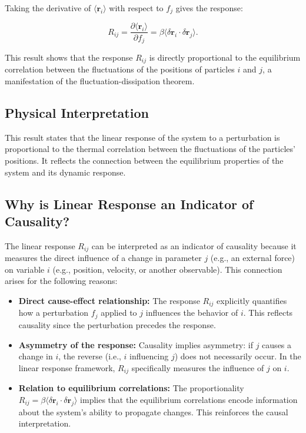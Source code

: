 \documentclass[English, Lau, oneside]{sapthesis}
\begin{document}
\noindent Taking the derivative of $\langle \mathbf{r}_i \rangle$ with respect to $f_j$ gives the response:

\begin{equation}
R_{ij} = \frac{\partial \langle \mathbf{r}_i \rangle}{\partial f_j} = \beta \langle \delta \mathbf{r}_i \cdot \delta \mathbf{r}_j \rangle. \label{response}
\end{equation}

\noindent This result shows that the response $R_{ij}$ is directly proportional to the equilibrium correlation between the fluctuations of the positions of particles $i$ and $j$, a manifestation of the fluctuation-dissipation theorem.

\subsection{Physical Interpretation}

\noindent This result states that the linear response of the system to a perturbation is proportional to the thermal correlation between the fluctuations of the particles' positions. It reflects the connection between the equilibrium properties of the system and its dynamic response.

\subsection{Why is Linear Response an Indicator of Causality?}

The linear response \(R_{ij}\) can be interpreted as an indicator of causality because it measures the direct influence of a change in parameter \(j\) (e.g., an external force) on variable \(i\) (e.g., position, velocity, or another observable). This connection arises for the following reasons:

\begin{itemize}
    \item \textbf{Direct cause-effect relationship:} The response \(R_{ij}\) explicitly quantifies how a perturbation \(f_j\) applied to \(j\) influences the behavior of \(i\). This reflects causality since the perturbation precedes the response.
    \item \textbf{Asymmetry of the response:} Causality implies asymmetry: if \(j\) causes a change in \(i\), the reverse (i.e., \(i\) influencing \(j\)) does not necessarily occur. In the linear response framework, \(R_{ij}\) specifically measures the influence of \(j\) on \(i\).
    \item \textbf{Relation to equilibrium correlations:} The proportionality \(R_{ij} = \beta \langle \delta \mathbf{r}_i \cdot \delta \mathbf{r}_j \rangle\) implies that the equilibrium correlations encode information about the system's ability to propagate changes. This reinforces the causal interpretation.
\end{itemize}
\end{document}
